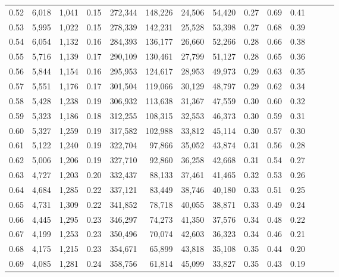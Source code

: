 \begin{tabular}{rrrrrrrrrrrrrr}
0.52 &   6,018 &  1,041 &  0.15 &  272,344 &  148,226 &  24,506 &  54,420 &  0.27 &  0.69 &      0.41 \\
0.53 &   5,995 &  1,022 &  0.15 &  278,339 &  142,231 &  25,528 &  53,398 &  0.27 &  0.68 &      0.39 \\
0.54 &   6,054 &  1,132 &  0.16 &  284,393 &  136,177 &  26,660 &  52,266 &  0.28 &  0.66 &      0.38 \\
0.55 &   5,716 &  1,139 &  0.17 &  290,109 &  130,461 &  27,799 &  51,127 &  0.28 &  0.65 &      0.36 \\
0.56 &   5,844 &  1,154 &  0.16 &  295,953 &  124,617 &  28,953 &  49,973 &  0.29 &  0.63 &      0.35 \\
0.57 &   5,551 &  1,176 &  0.17 &  301,504 &  119,066 &  30,129 &  48,797 &  0.29 &  0.62 &      0.34 \\
0.58 &   5,428 &  1,238 &  0.19 &  306,932 &  113,638 &  31,367 &  47,559 &  0.30 &  0.60 &      0.32 \\
0.59 &   5,323 &  1,186 &  0.18 &  312,255 &  108,315 &  32,553 &  46,373 &  0.30 &  0.59 &      0.31 \\
0.60 &   5,327 &  1,259 &  0.19 &  317,582 &  102,988 &  33,812 &  45,114 &  0.30 &  0.57 &      0.30 \\
0.61 &   5,122 &  1,240 &  0.19 &  322,704 &   97,866 &  35,052 &  43,874 &  0.31 &  0.56 &      0.28 \\
0.62 &   5,006 &  1,206 &  0.19 &  327,710 &   92,860 &  36,258 &  42,668 &  0.31 &  0.54 &      0.27 \\
0.63 &   4,727 &  1,203 &  0.20 &  332,437 &   88,133 &  37,461 &  41,465 &  0.32 &  0.53 &      0.26 \\
0.64 &   4,684 &  1,285 &  0.22 &  337,121 &   83,449 &  38,746 &  40,180 &  0.33 &  0.51 &      0.25 \\
0.65 &   4,731 &  1,309 &  0.22 &  341,852 &   78,718 &  40,055 &  38,871 &  0.33 &  0.49 &      0.24 \\
0.66 &   4,445 &  1,295 &  0.23 &  346,297 &   74,273 &  41,350 &  37,576 &  0.34 &  0.48 &      0.22 \\
0.67 &   4,199 &  1,253 &  0.23 &  350,496 &   70,074 &  42,603 &  36,323 &  0.34 &  0.46 &      0.21 \\
0.68 &   4,175 &  1,215 &  0.23 &  354,671 &   65,899 &  43,818 &  35,108 &  0.35 &  0.44 &      0.20 \\
0.69 &   4,085 &  1,281 &  0.24 &  358,756 &   61,814 &  45,099 &  33,827 &  0.35 &  0.43 &      0.19 \\

\end{tabular}
